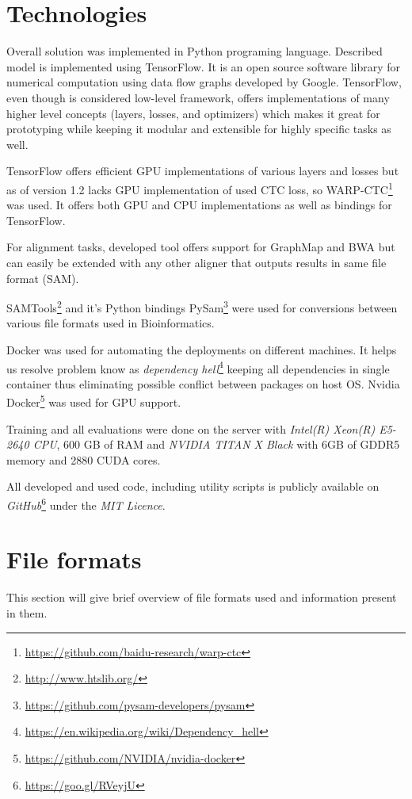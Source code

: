 \documentclass[times, utf8, diplomski, numeric, english]{fer}
\begin{document}
\section{Technologies}

Overall solution was implemented in Python programing language. Described model is implemented using TensorFlow. It is an open source software library for numerical computation using data flow graphs developed by Google. TensorFlow, even though is considered low-level framework, offers implementations of many higher level concepts (layers, losses, and optimizers) which makes it great for prototyping while keeping it modular and extensible for highly specific tasks as well.

TensorFlow offers efficient GPU implementations of various layers and losses but as of version 1.2 lacks GPU implementation of used CTC loss, so WARP-CTC\footnote{\url{https://github.com/baidu-research/warp-ctc}} was used. It offers both GPU and CPU implementations as well as bindings for TensorFlow.

For alignment tasks, developed tool offers support for GraphMap and BWA but can easily be extended with any other aligner that outputs results in same file format (SAM).

SAMTools\footnote{\url{http://www.htslib.org/}} and it's Python bindings PySam\footnote{\url{https://github.com/pysam-developers/pysam}} were used for conversions between various file formats used in Bioinformatics.

Docker was used for automating the deployments on different machines. It helps us resolve problem know as \textit{dependency hell}\footnote{\url{https://en.wikipedia.org/wiki/Dependency_hell}}  keeping all dependencies in single container thus eliminating possible conflict between packages on host OS.
Nvidia Docker\footnote{\url{https://github.com/NVIDIA/nvidia-docker}} was used for GPU support.


Training and all evaluations were done on the server with  \textit{Intel(R) Xeon(R) E5-2640 CPU}, 600 GB of RAM and \textit{NVIDIA TITAN X Black} with 6GB of GDDR5 memory and 2880 CUDA cores.

All developed and used code, including utility scripts is publicly available on \textit{GitHub}\footnote{\url{https://goo.gl/RVeyjU}} under the \textit{MIT Licence}.

\section{File formats}
This section will give brief overview of file formats used and information present in them.
\end{document}
